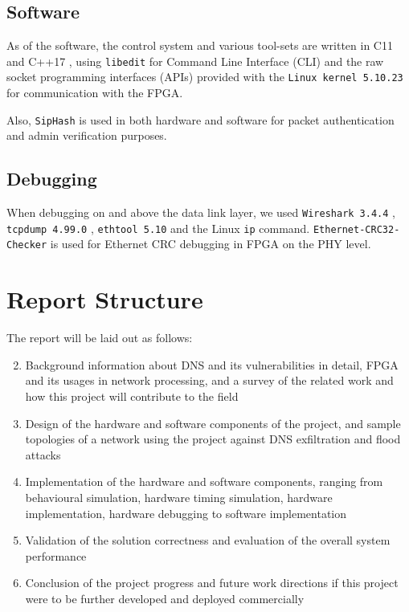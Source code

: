 \documentclass[a4paper]{report}
\newcommand{\proglang}{\textsf}
\newcommand{\code}{\texttt}
\begin{document}
\subsection{Software}
As of the software, the control system and various tool-sets are written in \proglang{C11} \cite{iso-c} and \proglang{C++17} \cite{iso-cc}, using \code{libedit} \cite{thrysoee-2004} for Command Line Interface (CLI) and the raw socket programming interfaces (APIs) provided with the \code{Linux kernel 5.10.23} \cite{kroah-hartman-2021} for communication with the FPGA.

Also, \code{SipHash} \cite{aumasson-bernstein-2012} is used in both hardware and software for packet authentication and admin verification purposes.

\subsection{Debugging}
When debugging on and above the data link layer, we used \code{Wireshark 3.4.4} \cite{wireshark-2021}, \code{tcpdump 4.99.0}
 \cite{tcpdump-2020}, \code{ethtool 5.10} \cite{kroah-hartman-2021} and the Linux \code{ip} command. \code{Ethernet-CRC32-Checker} \cite{jwbensley-2020} is used for Ethernet CRC debugging in FPGA on the PHY level.

\section{Report Structure}
The report will be laid out as follows:

\begin{enumerate}[leftmargin=*, label=Chapter \arabic* - ]
\setcounter{enumi}{1}
\item Background information about DNS and its vulnerabilities in detail, FPGA and its usages in network processing, and a survey of the related work and how this project will contribute to the field
\item Design of the hardware and software components of the project, and sample topologies of a network using the project against DNS exfiltration and flood attacks
\item Implementation of the hardware and software components, ranging from behavioural simulation, hardware timing simulation, hardware implementation, hardware debugging to software implementation
\item Validation of the solution correctness and evaluation of the overall system performance
\item Conclusion of the project progress and future work directions if this project were to be further developed and deployed commercially
\end{enumerate}
\end{document}
